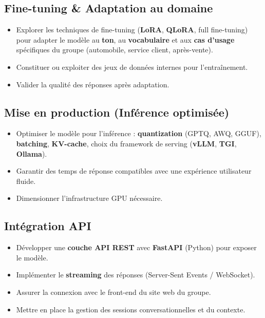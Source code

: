 \documentclass[12pt,a4paper]{article}
\begin{document}
\subsection{Fine-tuning \& Adaptation au domaine}

\begin{itemize}[leftmargin=1.5em, itemsep=4pt]
    \item Explorer les techniques de fine-tuning (\textbf{LoRA}, \textbf{QLoRA}, full fine-tuning) pour adapter le modèle au \textbf{ton}, au \textbf{vocabulaire} et aux \textbf{cas d'usage} spécifiques du groupe (automobile, service client, après-vente).
    \item Constituer ou exploiter des jeux de données internes pour l'entraînement.
    \item Valider la qualité des réponses après adaptation.
\end{itemize}

\subsection{Mise en production (Inférence optimisée)}

\begin{itemize}[leftmargin=1.5em, itemsep=4pt]
    \item Optimiser le modèle pour l'inférence : \textbf{quantization} (GPTQ, AWQ, GGUF), \textbf{batching}, \textbf{KV-cache}, choix du framework de serving (\textbf{vLLM}, \textbf{TGI}, \textbf{Ollama}).
    \item Garantir des temps de réponse compatibles avec une expérience utilisateur fluide.
    \item Dimensionner l'infrastructure GPU nécessaire.
\end{itemize}

\subsection{Intégration API}

\begin{itemize}[leftmargin=1.5em, itemsep=4pt]
    \item Développer une \textbf{couche API REST} avec \textbf{FastAPI} (Python) pour exposer le modèle.
    \item Implémenter le \textbf{streaming} des réponses (Server-Sent Events / WebSocket).
    \item Assurer la connexion avec le front-end du site web du groupe.
    \item Mettre en place la gestion des sessions conversationnelles et du contexte.
\end{itemize}
\end{document}

